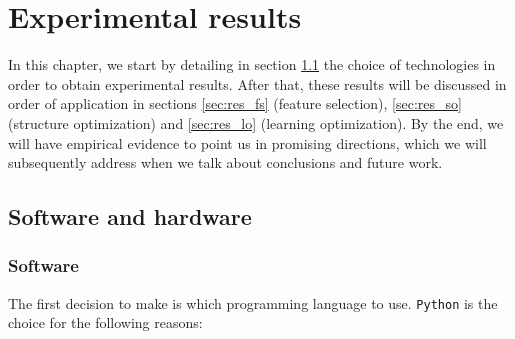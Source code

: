 \chapter{Experimental results}\label{ch:experiments}

In this chapter, we start by detailing in section \ref{sec:technologies} the choice of technologies in order to obtain experimental results. After that, these results will be discussed in order of application in sections \ref{sec:res_fs} (feature selection), \ref{sec:res_so} (structure optimization) and \ref{sec:res_lo} (learning optimization). By the end, we will have empirical evidence to point us in promising directions, which we will subsequently address when we talk about conclusions and future work.

\section{Software and hardware}\label{sec:technologies}

	\subsection{Software}

		The first decision to make is which programming language to use. \texttt{Python} is the choice for the following reasons:

